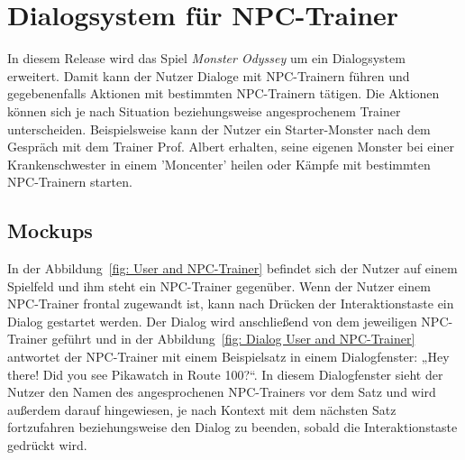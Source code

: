 \section{Dialogsystem für NPC-Trainer}\label{sec:dialogsystem-fur-npc-trainer}
In diesem Release wird das Spiel \textit{Monster Odyssey} um ein Dialogsystem erweitert. Damit kann der Nutzer Dialoge mit NPC-Trainern führen und gegebenenfalls Aktionen mit bestimmten NPC-Trainern tätigen.
Die Aktionen können sich je nach Situation beziehungsweise angesprochenem Trainer unterscheiden.
Beispielsweise kann der Nutzer ein Starter-Monster nach dem Gespräch mit dem Trainer Prof. Albert erhalten, seine eigenen Monster bei einer Krankenschwester in einem 'Moncenter' heilen oder Kämpfe mit bestimmten NPC-Trainern starten.
\subsection{Mockups}\label{subsec:mockups-dialogsystem}
In der Abbildung~\ref{fig: User and NPC-Trainer} befindet sich der Nutzer auf einem Spielfeld und ihm steht ein NPC-Trainer gegenüber. Wenn der Nutzer einem NPC-Trainer frontal zugewandt ist, kann nach Drücken der Interaktionstaste ein Dialog gestartet werden. Der Dialog wird anschließend von dem jeweiligen NPC-Trainer geführt und in der Abbildung~\ref{fig: Dialog User and NPC-Trainer} antwortet der NPC-Trainer mit einem Beispielsatz in einem Dialogfenster: „Hey there! Did you see Pikawatch in Route 100?“. In diesem Dialogfenster sieht der Nutzer den Namen des angesprochenen NPC-Trainers vor dem Satz und wird außerdem darauf hingewiesen, je nach Kontext mit dem nächsten Satz fortzufahren beziehungsweise den Dialog zu beenden, sobald die Interaktionstaste gedrückt wird.
